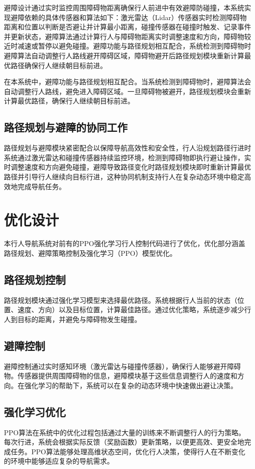 避障设计通过实时监控周围障碍物距离确保行人前进中有效避障防碰撞，本系统实现避障依赖的具体传感器和算法如下：激光雷达（Lidar）传感器实时检测障碍物距离和位置以判断是否避让并计算最小距离，碰撞传感器在碰撞时触发、记录事件并更新状态，避障算法通过计算行人与障碍物距离实时调整速度和方向，障碍物较近时减速或暂停以避免碰撞。避障功能与路径规划相互配合，系统检测到障碍物时避障算法自动调整行人路线避开障碍区域，障碍物避开后路径规划模块重新计算最优路径确保行人继续朝目标前进。

在本系统中，避障功能与路径规划相互配合。当系统检测到障碍物时，避障算法会自动调整行人路线，避免进入障碍区域。一旦障碍物被避开，路径规划模块会重新计算最优路径，确保行人继续朝目标前进。

\subsection{路径规划与避障的协同工作}

路径规划与避障模块紧密配合以保障导航高效性和安全性，行人沿规划路径行进时系统通过激光雷达和碰撞传感器持续监控环境，检测到障碍物即执行避让操作，实时调整速度和方向避免碰撞，避障导致路径变化时路径规划模块即时重新计算最优路径并引导行人继续向目标行进，这种协同机制支持行人在复杂动态环境中稳定高效地完成导航任务。

\section{优化设计}

本行人导航系统对前有的PPO强化学习行人控制代码进行了优化，优化部分涵盖路径规划、避障策略控制及强化学习（PPO）模型优化。

\subsection{路径规划控制}
路径规划模块通过强化学习模型来选择最优路径。系统根据行人当前的状态（位置、速度、方向）以及目标位置，计算最佳路径。通过优化策略，系统逐步减少行人到目标的距离，并避免与障碍物发生碰撞。

\subsection{避障控制}
避障控制通过实时感知环境（激光雷达与碰撞传感器），确保行人能够避开障碍物。传感器提供周围障碍物的信息，避障模块基于这些信息调整行人的速度和方向。在强化学习的帮助下，系统可以在复杂的动态环境中快速做出避让决策。

\subsection{强化学习优化}
PPO算法在系统中的优化过程包括通过大量的训练来不断调整行人的行为策略。每次行进，系统会根据实际反馈（奖励函数）更新策略，以便更高效、更安全地完成任务。PPO算法能够处理高维状态空间，优化行人决策，使得行人在不断变化的环境中能够适应复杂的导航需求。

